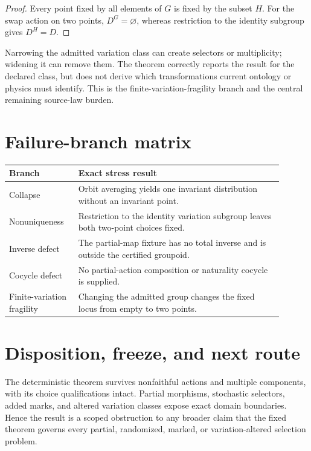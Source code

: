 \documentclass[11pt]{article}
\begin{document}
\begin{proof}
Every point fixed by all elements of \(G\) is fixed by the subset \(H\).
For the swap action on two points, \(D^G=\varnothing\), whereas restriction
to the identity subgroup gives \(D^H=D\).
\end{proof}

Narrowing the admitted variation class can create selectors or multiplicity;
widening it can remove them. The theorem correctly reports the result for the
declared class, but does not derive which transformations current ontology or
physics must identify. This is the finite-variation-fragility branch and the
central remaining source-law burden.

\section{Failure-branch matrix}

\begin{longtable}{p{0.22\linewidth}p{0.68\linewidth}}
\toprule
Branch & Exact stress result \\
\midrule
Collapse & Orbit averaging yields one invariant distribution without an invariant point. \\
Nonuniqueness & Restriction to the identity variation subgroup leaves both two-point choices fixed. \\
Inverse defect & The partial-map fixture has no total inverse and is outside the certified groupoid. \\
Cocycle defect & No partial-action composition or naturality cocycle is supplied. \\
Finite-variation fragility & Changing the admitted group changes the fixed locus from empty to two points. \\
\bottomrule
\end{longtable}

\section{Disposition, freeze, and next route}

The deterministic theorem survives nonfaithful actions and multiple
components, with its choice qualifications intact. Partial morphisms,
stochastic selectors, added marks, and altered variation classes expose exact
domain boundaries. Hence the result is a scoped obstruction to any broader
claim that the fixed theorem governs every partial, randomized, marked, or
variation-altered selection problem.
\end{document}
